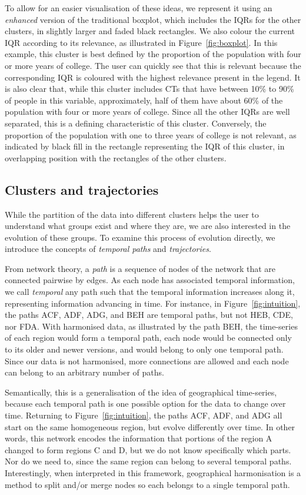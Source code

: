 To allow for an easier visualisation of these ideas, we represent it using an
\emph{enhanced} version of the traditional boxplot, which includes the IQRs for
the other clusters, in slightly larger and faded black rectangles. We also
colour the current IQR according to its relevance, as illustrated in
Figure~\ref{fig:boxplot}. In this example, this cluster is best defined by the
proportion of the population with four or more years of college. The user can
quickly see that this is relevant because the corresponding IQR is coloured with
the highest relevance present in the legend. It is also clear that, while this
cluster includes CTs that have between 10\% to 90\% of people in this variable,
approximately, half of them have about 60\% of the population with four or more
years of college. Since all the other IQRs are well separated, this is a
defining characteristic of this cluster. Conversely, the proportion of the
population with one to three years of college is not relevant, as indicated by
black fill in the rectangle representing the IQR of this cluster, in overlapping
position with the rectangles of the other clusters.

\subsection{Clusters and trajectories}
While the partition of the data into different clusters helps the user to
understand what groups exist and where they are, we are also interested in the
evolution of these groups. To examine this process of evolution directly, we
introduce the concepts of \emph{temporal paths} and \emph{trajectories}. 

From network theory, a \emph{path} is a sequence of nodes of the network that
are connected pairwise by edges. As each node has associated temporal
information, we call \emph{temporal} any path such that the temporal information
increases along it, representing information advancing in time. For instance, in
Figure~\ref{fig:intuition}, the paths ACF, ADF, ADG, and BEH are temporal paths,
but not HEB, CDE, nor FDA. With harmonised data, as illustrated by the path BEH,
the time-series of each region would form a temporal path, each node would be
connected only to its older and newer versions, and would belong to only one
temporal path. Since our data is not harmonised, more connections are allowed
and each node can belong to an arbitrary number of paths.

Semantically, this is a generalisation of the idea of geographical time-series,
because each temporal path is one possible option for the data to change over
time. Returning to Figure~\ref{fig:intuition}, the paths ACF, ADF, and ADG all
start on the same homogeneous region, but evolve differently over time. In other
words, this network encodes the information that portions of the region A
changed to form regions C and D, but we do not know specifically which parts.
Nor do we need to, since the same region can belong to several temporal paths.
Interestingly, when interpreted in this framework, geographical harmonisation is
a method to split and/or merge nodes so each belongs to a single temporal path.

